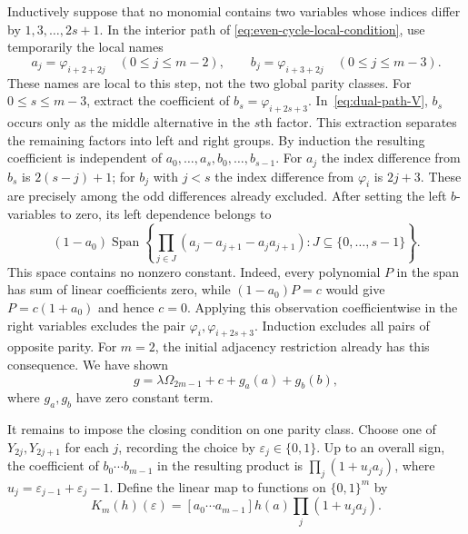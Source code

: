 \documentclass[reqno]{article}
\theoremstyle{plain} %
\theoremstyle{definition}
\theoremstyle{remark}
\DeclareMathOperator{\Span}{Span}
\numberwithin{equation}{section}
\begin{document}
Inductively suppose that no monomial contains two variables whose indices
differ by $1,3,\ldots,2s+1$. In the interior path of
\eqref{eq:even-cycle-local-condition}, use temporarily the local names
\[
 a_j=\varphi_{i+2+2j}\quad(0\le j\le m-2),\qquad
 b_j=\varphi_{i+3+2j}\quad(0\le j\le m-3).
\]
These names are local to this step, not the two global parity classes.
For $0\le s\le m-3$, extract the coefficient of
$b_s=\varphi_{i+2s+3}$.
In~\eqref{eq:dual-path-V}, $b_s$ occurs only as the middle alternative
in the $s$th factor. This extraction separates the remaining factors
into left and right groups. By induction the resulting coefficient is
independent of $a_0,\ldots,a_s,b_0,\ldots,b_{s-1}$. For $a_j$ the
index difference from $b_s$ is $2(s-j)+1$; for $b_j$ with $j<s$ the
index difference from $\varphi_i$ is $2j+3$. These are precisely among
the odd differences already excluded.
After setting the left $b$-variables to zero, its left dependence belongs
to
\begin{equation}\label{eq:no-constant-left-space}
(1-a_0)\Span\left\{
\prod_{j\in J}(a_j-a_{j+1}-a_ja_{j+1}):J\subseteq\{0,\ldots,s-1\}
\right\}.
\end{equation}
This space contains no nonzero constant. Indeed, every polynomial $P$
in the span has sum of linear coefficients zero, while
$(1-a_0)P=c$ would give $P=c(1+a_0)$ and hence $c=0$.
Applying this observation coefficientwise in the right variables excludes
the pair $\varphi_i,\varphi_{i+2s+3}$. Induction excludes all pairs of
opposite parity. For $m=2$, the initial adjacency restriction already
has this consequence. We have shown
\begin{equation}\label{eq:even-support-decomposition}
g=\lambda\Omega_{2m-1}+c+g_a(a)+g_b(b),
\end{equation}
where $g_a,g_b$ have zero constant term.

It remains to impose the closing condition on one parity class.
Choose one of $Y_{2j},Y_{2j+1}$ for each $j$, recording the choice by
$\varepsilon_j\in\{0,1\}$. Up to an overall sign, the coefficient of
$b_0\cdots b_{m-1}$ in the resulting product is
$\prod_j(1+u_ja_j)$, where $u_j=\varepsilon_{j-1}+\varepsilon_j-1$.
Define the linear map to functions on $\{0,1\}^m$ by
\begin{equation}\label{eq:Boolean-closing-map}
K_m(h)(\varepsilon)
=[a_0\cdots a_{m-1}]h(a)\prod_j(1+u_ja_j).
\end{equation}
\end{document}
